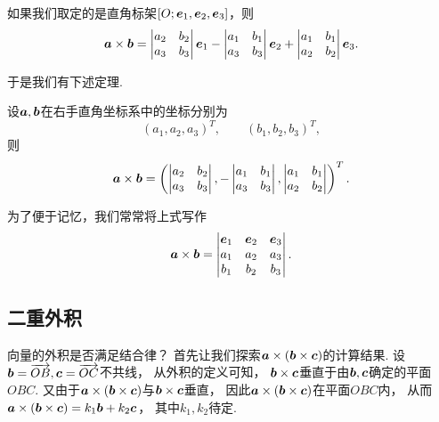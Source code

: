 如果我们取定的是直角标架\([O;\boldsymbol{e}_1,\boldsymbol{e}_2,\boldsymbol{e}_3]\)，则
\begin{equation}
	\boldsymbol{a}\times\boldsymbol{b}
	= \begin{vmatrix}
		a_2 & b_2 \\
		a_3 & b_3
	\end{vmatrix}
	\boldsymbol{e}_1
	- \begin{vmatrix}
		a_1 & b_1 \\
		a_3 & b_3
	\end{vmatrix}
	\boldsymbol{e}_2
	+ \begin{vmatrix}
		a_1 & b_1 \\
		a_2 & b_2
	\end{vmatrix}
	\boldsymbol{e}_3.
\end{equation}

于是我们有下述定理.
\begin{theorem}
设\(\boldsymbol{a},\boldsymbol{b}\)在右手直角坐标系中的坐标分别为\[
	(a_1,a_2,a_3)^T, \qquad
	(b_1,b_2,b_3)^T,
\]
则
\begin{equation}
	\boldsymbol{a}\times\boldsymbol{b}
	= \left( \begin{vmatrix}
		a_2 & b_2 \\
		a_3 & b_3
	\end{vmatrix},
	- \begin{vmatrix}
		a_1 & b_1 \\
		a_3 & b_3
	\end{vmatrix},
	\begin{vmatrix}
		a_1 & b_1 \\
		a_2 & b_2
	\end{vmatrix} \right)^T.
\end{equation}
\end{theorem}
为了便于记忆，我们常常将上式写作\begin{equation}
	\boldsymbol{a}\times\boldsymbol{b}
	= \begin{vmatrix}
		\boldsymbol{e}_1 & \boldsymbol{e}_2 & \boldsymbol{e}_3 \\
		a_1 & a_2 & a_3 \\
		b_1 & b_2 & b_3
	\end{vmatrix}.
\end{equation}

\subsection{二重外积}
向量的外积是否满足结合律？
首先让我们探索\(\boldsymbol{a}\times(\boldsymbol{b}\times\boldsymbol{c})\)的计算结果.
设\(\boldsymbol{b}=\overrightarrow{OB},\boldsymbol{c}=\overrightarrow{OC}\)不共线，
从外积的定义可知，
\(\boldsymbol{b}\times\boldsymbol{c}\)垂直于由\(\boldsymbol{b},\boldsymbol{c}\)确定的平面\(OBC\).
又由于\(\boldsymbol{a}\times(\boldsymbol{b}\times\boldsymbol{c})\)与\(\boldsymbol{b}\times\boldsymbol{c}\)垂直，
因此\(\boldsymbol{a}\times(\boldsymbol{b}\times\boldsymbol{c})\)在平面\(OBC\)内，
从而\(\boldsymbol{a}\times(\boldsymbol{b}\times\boldsymbol{c}) = k_1 \boldsymbol{b} + k_2 \boldsymbol{c}\)，
其中\(k_1,k_2\)待定.

